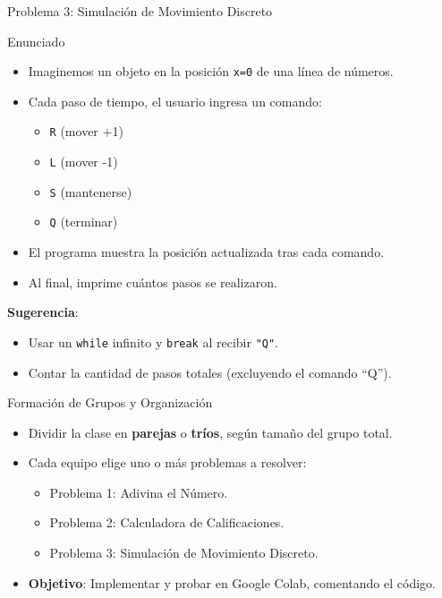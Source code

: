 \documentclass[10pt]{beamer}
\begin{document}
\begin{frame}{Problema 3: Simulación de Movimiento Discreto}
  \begin{block}{Enunciado}
    \begin{itemize}
      \item Imaginemos un objeto en la posición \texttt{x=0} de una línea de números.
      \item Cada paso de tiempo, el usuario ingresa un comando:
        \begin{itemize}
          \item \texttt{R} (mover +1)
          \item \texttt{L} (mover -1)
          \item \texttt{S} (mantenerse)
          \item \texttt{Q} (terminar)
        \end{itemize}
      \item El programa muestra la posición actualizada tras cada comando.
      \item Al final, imprime cuántos pasos se realizaron.
    \end{itemize}
  \end{block}
  \textbf{Sugerencia}:
  \begin{itemize}
    \item Usar un \texttt{while} infinito y \texttt{break} al recibir \texttt{"Q"}.
    \item Contar la cantidad de pasos totales (excluyendo el comando “Q”).
  \end{itemize}
\end{frame}

\begin{frame}{Formación de Grupos y Organización}
  \begin{itemize}
    \item Dividir la clase en \textbf{parejas} o \textbf{tríos}, según tamaño del grupo total.
    \item Cada equipo elige uno o más problemas a resolver:
      \begin{itemize}
        \item Problema 1: Adivina el Número.
        \item Problema 2: Calculadora de Calificaciones.
        \item Problema 3: Simulación de Movimiento Discreto.
      \end{itemize}
    \item \textbf{Objetivo}: Implementar y probar en Google Colab, comentando el código.
  \end{itemize}
\end{frame}
\end{document}
